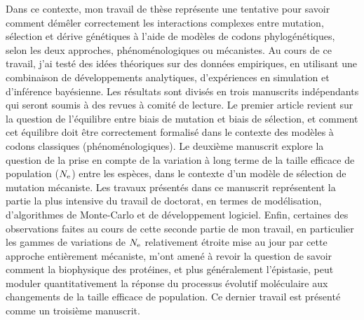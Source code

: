 Dans ce contexte, mon travail de thèse représente une tentative pour savoir comment démêler correctement les interactions complexes entre mutation, sélection et dérive génétiques à l'aide de modèles de codons phylogénétiques, selon les deux approches, phénoménologiques ou mécanistes.
Au cours de ce travail, j'ai testé des idées théoriques sur des données empiriques, en utilisant une combinaison de développements analytiques, d'expériences en simulation et d'inférence bayésienne.
Les résultats sont divisés en trois manuscrits indépendants qui seront soumis à des revues à comité de lecture.
Le premier article revient sur la question de l'équilibre entre biais de mutation et biais de sélection, et comment cet équilibre doit être correctement formalisé dans le contexte des modèles à codons classiques (phénoménologiques).
Le deuxième manuscrit explore la question de la prise en compte de la variation à long terme de la taille efficace de population ($N_{\textrm{e}}$) entre les espèces, dans le contexte d'un modèle de sélection de mutation mécaniste.
Les travaux présentés dans ce manuscrit représentent la partie la plus intensive du travail de doctorat, en termes de modélisation, d'algorithmes de Monte-Carlo et de développement logiciel.
Enfin, certaines des observations faites au cours de cette seconde partie de mon travail, en particulier les gammes de variations de $N_{\textrm{e}}$ relativement étroite mise au jour par cette approche entièrement mécaniste, m'ont amené à revoir la question de savoir comment la biophysique des protéines, et plus généralement l'épistasie, peut moduler quantitativement la réponse du processus évolutif moléculaire aux changements de la taille efficace de population.
Ce dernier travail est présenté comme un troisième manuscrit.

